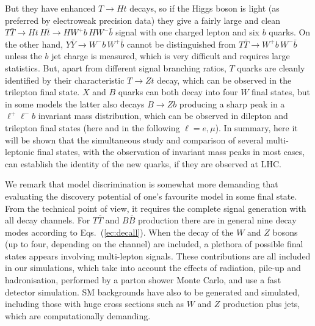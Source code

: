 \documentclass[12pt,a4paper]{article}
\newcommand{\TT}{T \bar T}
\newcommand{\BB}{B \bar B}
\newcommand{\YY}{Y \bar Y}
\begin{document}
But they have enhanced $T \to Ht$ decays, so if the Higgs boson is light (as preferred by electroweak precision data) they give a fairly large and clean $\TT \to Ht \, H \bar t \to H W^+ b \, H W^- \bar b$ signal with one charged lepton and six $b$ quarks. On the other hand, $\YY  \to W^- b \, W^+ \bar b$ cannot be distinguished from $\TT \to W^+ b \, W^- \bar b$ unless the $b$ jet charge is measured, which is very difficult and requires large statistics. But, apart from different signal branching ratios, $T$ quarks are cleanly identified by their characteristic $T \to Zt$ decay, which can be observed in the trilepton final state. $X$ and $B$ quarks can both decay into four $W$ final states, but in some models the latter also decays $B \to Zb$ producing a sharp peak in a $\ell^+ \ell^- b$ invariant mass distribution, which can be observed in dilepton and trilepton final states (here and in the following $\ell=e,\mu$). In summary, here it will be shown that the simultaneous study and comparison of several multi-leptonic final states, with the observation of invariant mass peaks in most cases, can establish the identity of the new quarks, if they are observed at LHC.

We remark that model discrimination is somewhat more demanding that evaluating the discovery potential of one's favourite model in some final state. From the technical point of view, it requires the complete signal generation with all decay channels. For $\TT$ and $\BB$ production there are in general nine decay modes according to Eqs.~(\ref{ec:decall}). When the decay of the $W$ and $Z$ bosons (up to four, depending on the channel) are included, a plethora of possible final states appears involving multi-lepton signals. These contributions are all included in our simulations, which take into account the effects of radiation, pile-up and hadronisation, performed by a parton shower Monte Carlo, and use a fast detector simulation. SM backgrounds have also to be generated and simulated, including those with huge cross sections such as $W$ and $Z$ production plus jets, which are computationally demanding.
\end{document}
